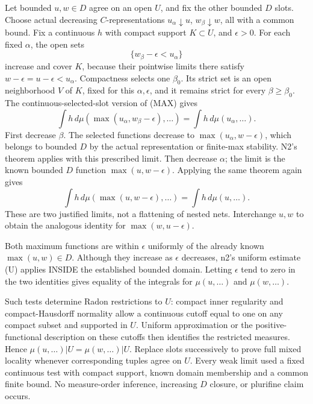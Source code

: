 Let bounded \(u,w\in D\) agree on an open \(U\), and fix the other bounded \(D\) slots. Choose actual decreasing \(C\)-representations \(u_\alpha\downarrow u\), \(w_\beta\downarrow w\), all with a common bound. Fix a continuous \(h\) with compact support \(K\subset U\), and \(\epsilon>0\). For each fixed \(\alpha\), the open sets
\[
\{w_\beta-\epsilon<u_\alpha\}
\]
increase and cover \(K\), because their pointwise limits there satisfy \(w-\epsilon=u-\epsilon<u_\alpha\). Compactness selects one \(\beta_0\). Its strict set is an open neighborhood \(V\) of \(K\), fixed for this \(\alpha,\epsilon\), and it remains strict for every \(\beta\ge\beta_0\). The continuous-selected-slot version of (MAX) gives
\[
\int h\,d\mu(\max(u_\alpha,w_\beta-\epsilon),\ldots)
=\int h\,d\mu(u_\alpha,\ldots).
\]
First decrease \(\beta\). The selected functions decrease to \(\max(u_\alpha,w-\epsilon)\), which belongs to bounded \(D\) by the actual representation or finite-max stability. N2's theorem applies with this prescribed limit. Then decrease \(\alpha\); the limit is the known bounded \(D\) function \(\max(u,w-\epsilon)\). Applying the same theorem again gives
\[
\int h\,d\mu(\max(u,w-\epsilon),\ldots)=\int h\,d\mu(u,\ldots). \tag{L1}
\]
These are two justified limits, not a flattening of nested nets. Interchange \(u,w\) to obtain the analogous identity for \(\max(w,u-\epsilon)\).

Both maximum functions are within \(\epsilon\) uniformly of the already known \(\max(u,w)\in D\). Although they increase as \(\epsilon\) decreases, n2's uniform estimate (U) applies INSIDE the established bounded domain. Letting \(\epsilon\) tend to zero in the two identities gives equality of the integrals for \(\mu(u,\ldots)\) and \(\mu(w,\ldots)\).

Such tests determine Radon restrictions to \(U\): compact inner regularity and compact-Hausdorff normality allow a continuous cutoff equal to one on any compact subset and supported in \(U\). Uniform approximation or the positive-functional description on these cutoffs then identifies the restricted measures. Hence \(\mu(u,\ldots)|U=\mu(w,\ldots)|U\). Replace slots successively to prove full mixed locality whenever corresponding tuples agree on \(U\). Every weak limit used a fixed continuous test with compact support, known domain membership and a common finite bound. No measure-order inference, increasing \(D\) closure, or plurifine claim occurs.
